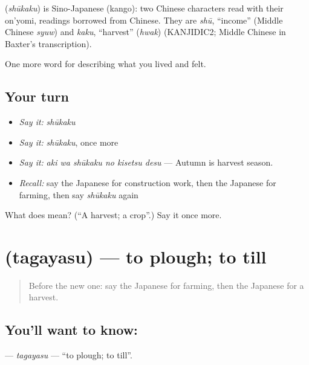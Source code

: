 \begin{cousinweb}
\textbf{} (\emph{shūkaku}) is Sino-Japanese (kango): two Chinese characters read with their on'yomi, readings borrowed from Chinese. They are \emph{shū}, \textquotedblleft{}income\textquotedblright{} (Middle Chinese \emph{syuw}) and \emph{kaku}, \textquotedblleft{}harvest\textquotedblright{} (\emph{hwak}) (KANJIDIC2; Middle Chinese in Baxter's transcription).
\end{cousinweb}

\begin{grammarlens}[title={What you've built}]
One more word for describing what you lived and felt.
\end{grammarlens}

\subsection*{Your turn}
\begin{itemize}
\raggedright
  \item \emph{Say it:} \emph{shūkaku}
  \item \emph{Say it:} \emph{shūkaku}, once more
  \item \emph{Say it:} \emph{aki wa shūkaku no kisetsu desu} — Autumn is harvest season.
  \item \emph{Recall:} say the Japanese for construction work, then the Japanese for farming, then say \emph{shūkaku} again
\end{itemize}

\begin{tcolorbox}[breakable,colback=teal!4,colframe=teal!35!black,title={Before you move on}]
What does  mean? (\textquotedblleft{}A harvest; a crop\textquotedblright{}.) Say it once more.
\end{tcolorbox}
\section[\texorpdfstring{\ja{たがやす} (tagayasu)}{たがやす (tagayasu)}]{ (tagayasu) — to plough; to till}

\label{lesson:JA-C489-tagayasu}



\begin{quote}
Before the new one: say the Japanese for farming, then the Japanese for a harvest.
\end{quote}

\subsection*{You'll want to know: }
\textbf{} — \emph{tagayasu} — \textquotedblleft{}to plough; to till\textquotedblright{}.


